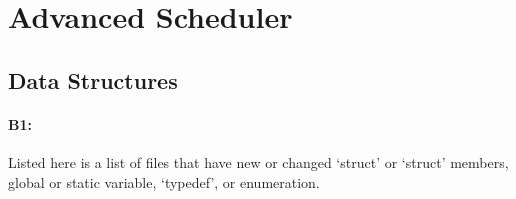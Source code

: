 \section{Advanced Scheduler}
\subsection{Data Structures}
\paragraph{B1:} %

Listed here is a list of files that have new or changed `struct' or `struct'
members, global or static variable, `typedef', or enumeration.

